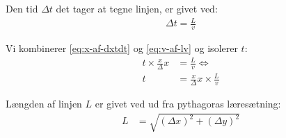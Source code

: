 
Den tid $\Delta t$ det tager at tegne linjen, er givet ved:
\begin{align}
\Delta t = \frac Lv \label{eq:v-af-lv}
\end{align}

Vi kombinerer \eqref{eq:x-af-dxtdt} og \eqref{eq:v-af-lv} og isolerer
$t$:
\begin{align}
t \times \frac{x}\Delta x &= \frac Lv \Leftrightarrow \\
t &= \frac{x}\Delta x \times \frac Lv \label{eq:t-af-dxxlv}
\end{align}

Længden af linjen $L$ er givet ved ud fra pythagoras læresætning:
\begin{align}
L &= \sqrt{\left(\Delta x\right)^2 + \left(\Delta y\right)^2}
\end{align}

